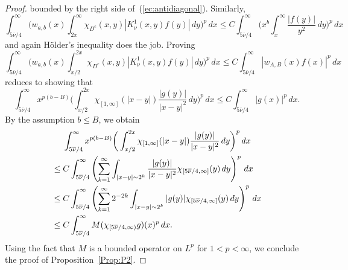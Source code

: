 \documentclass[leqno,a4paper]{amsart}
\newcommand{\overnu}{\overline{\nu}}
\begin{document}
\begin{proof}
bounded by the right side of~(\ref{ec:antidiagonal}). Similarly,
\begin{equation*}
\int_{5\overnu/4}^{\infty} \bigg(w_{a,b}(x)\int_{2x}^{\infty}
\chi_{D^c}(x,y) |K_\nu^{1}(x,y)f(y)|\,dy\bigg)^p\,dx
\le C\int_{5\overnu/4}^\infty \bigg(x^{b}\int_{x}^{\infty}
\frac{|f(y)|}{y^2}\, dy\bigg)^p\,dx
\end{equation*}
and again H\"older's inequality does the job. Proving
\begin{equation*}
\int_{5\overnu/4}^{\infty} \bigg(w_{a,b}(x)\int_{x/2}^{2x}
\chi_{D^c}(x,y) |K_\nu^{1}(x,y)f(y)|\,dy \bigg)^p\,dx
\le C \int_{5\overnu/4}^{\infty}|w_{A,B}(x)f(x)|^p\,dx
\end{equation*}
reduces to showing that
\begin{equation*}
\int_{5\overnu/4}^{\infty}x^{p(b-B)}\bigg(\int_{x/2}^{2x}
\chi_{[1,\infty]}(|x-y|)\frac{|g(y)|}{|x-y|^2}\,dy\bigg)^p\,dx
\le C \int_{5\overnu/4}^{\infty}|g(x)|^p\,dx.
\end{equation*}
By the assumption $b\le B$, we obtain
\begin{align*}
&\phantom{\null\le\null}
\int_{5\overnu/4}^{\infty}x^{p(b-B)}\bigg(\int_{x/2}^{2x}
\chi_{[1,\infty]}(|x-y|)\frac{|g(y)|}{|x-y|^2}\,dy\bigg)^p\,dx\\
&\le C\int_{5\overnu/4}^\infty
\left( \sum_{k=1}^\infty\int_{|x-y|\sim 2^k} \frac{|g(y)|}{|x-y|^2}
\chi_{[5\overnu/4,\infty]}(y)\, dy\right)^p\, dx\\
&\le C\int_{5\overnu/4}^\infty
\left(\sum_{k=1}^\infty 2^{-2k}\int_{|x-y|\sim2^k} |g(y)|
\chi_{[5\overnu/4,\infty]}(y)\, dy\right)^p\,dx\\
&\le C\int_{5\overnu/4}^\infty
M(\chi_{[5\overnu/4,\infty)}g)(x)^p\,dx.
\end{align*}
Using the fact that $M$ is a bounded operator on $L^p$ for $1<p<\infty$,
we conclude the proof of Proposition~\ref{Prop:P2}.
\end{proof}
\end{document}
